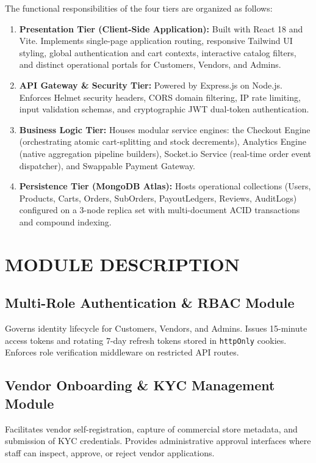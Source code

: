 \documentclass[12pt,a4paper]{report}
\begin{document}
The functional responsibilities of the four tiers are organized as follows:
\begin{enumerate}[leftmargin=1.5cm]
    \item \textbf{Presentation Tier (Client-Side Application):} Built with React 18 and Vite. Implements single-page application routing, responsive Tailwind UI styling, global authentication and cart contexts, interactive catalog filters, and distinct operational portals for Customers, Vendors, and Admins.
    \item \textbf{API Gateway \& Security Tier:} Powered by Express.js on Node.js. Enforces Helmet security headers, CORS domain filtering, IP rate limiting, input validation schemas, and cryptographic JWT dual-token authentication.
    \item \textbf{Business Logic Tier:} Houses modular service engines: the Checkout Engine (orchestrating atomic cart-splitting and stock decrements), Analytics Engine (native aggregation pipeline builders), Socket.io Service (real-time order event dispatcher), and Swappable Payment Gateway.
    \item \textbf{Persistence Tier (MongoDB Atlas):} Hosts operational collections (Users, Products, Carts, Orders, SubOrders, PayoutLedgers, Reviews, AuditLogs) configured on a 3-node replica set with multi-document ACID transactions and compound indexing.
\end{enumerate}

\section{MODULE DESCRIPTION}

\subsection{Multi-Role Authentication \& RBAC Module}
Governs identity lifecycle for Customers, Vendors, and Admins. Issues 15-minute access tokens and rotating 7-day refresh tokens stored in \texttt{httpOnly} cookies. Enforces role verification middleware on restricted API routes.

\subsection{Vendor Onboarding \& KYC Management Module}
Facilitates vendor self-registration, capture of commercial store metadata, and submission of KYC credentials. Provides administrative approval interfaces where staff can inspect, approve, or reject vendor applications.
\end{document}
